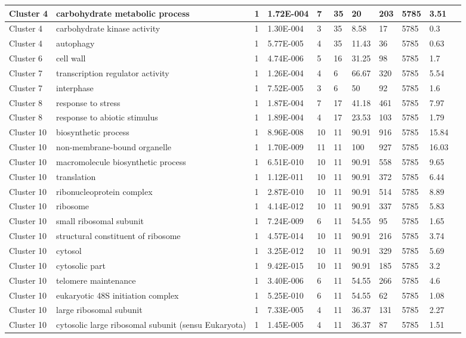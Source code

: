 \begin{tabular}{|l|l|l|l|l|l|l|l|l|l|l|}
\hline
Cluster 4&carbohydrate metabolic process&1&1.72E-004&7&35&20&203&5785&3.51&\\
\hline
Cluster 4&carbohydrate kinase activity&1&1.30E-004&3&35&8.58&17&5785&0.3&\\
\hline
Cluster 4&autophagy&1&5.77E-005&4&35&11.43&36&5785&0.63&\\
\hline
Cluster 6&cell wall&1&4.74E-006&5&16&31.25&98&5785&1.7&\\
\hline
Cluster 7&transcription regulator activity&1&1.26E-004&4&6&66.67&320&5785&5.54&\\
\hline
Cluster 7&interphase&1&7.52E-005&3&6&50&92&5785&1.6&\\
\hline
Cluster 8&response to stress&1&1.87E-004&7&17&41.18&461&5785&7.97&\\
\hline
Cluster 8&response to abiotic stimulus&1&1.89E-004&4&17&23.53&103&5785&1.79&\\
\hline
Cluster 10&biosynthetic process&1&8.96E-008&10&11&90.91&916&5785&15.84&\\
\hline
Cluster 10&non-membrane-bound organelle&1&1.70E-009&11&11&100&927&5785&16.03&\\
\hline
Cluster 10&macromolecule biosynthetic process&1&6.51E-010&10&11&90.91&558&5785&9.65&\\
\hline
Cluster 10&translation&1&1.12E-011&10&11&90.91&372&5785&6.44&\\
\hline
Cluster 10&ribonucleoprotein complex&1&2.87E-010&10&11&90.91&514&5785&8.89&\\
\hline
Cluster 10&ribosome&1&4.14E-012&10&11&90.91&337&5785&5.83&\\
\hline
Cluster 10&small ribosomal subunit&1&7.24E-009&6&11&54.55&95&5785&1.65&\\
\hline
Cluster 10&structural constituent of ribosome&1&4.57E-014&10&11&90.91&216&5785&3.74&\\
\hline
Cluster 10&cytosol&1&3.25E-012&10&11&90.91&329&5785&5.69&\\
\hline
Cluster 10&cytosolic part&1&9.42E-015&10&11&90.91&185&5785&3.2&\\
\hline
Cluster 10&telomere maintenance&1&3.40E-006&6&11&54.55&266&5785&4.6&\\
\hline
Cluster 10&eukaryotic 48S initiation complex&1&5.25E-010&6&11&54.55&62&5785&1.08&\\
\hline
Cluster 10&large ribosomal subunit&1&7.33E-005&4&11&36.37&131&5785&2.27&\\
\hline
Cluster 10&cytosolic large ribosomal subunit (sensu Eukaryota)&1&1.45E-005&4&11&36.37&87&5785&1.51&\\

\end{tabular}
